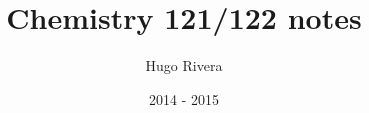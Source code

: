 \documentclass[letterpaper,10pt]{article}
\begin{document}
\title{Chemistry 121/122 notes}
\author{Hugo Rivera}
\date{2014 - 2015}
\maketitle

\dosecttoc
\setlength{\mtcindent}{5pt}
\begin{multicols}{2}
\tableofcontents
\end{multicols}





















\end{document}
